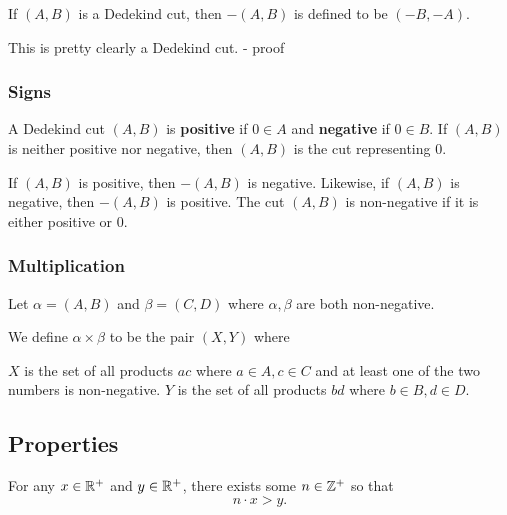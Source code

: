 If $(A,B)$ is a Dedekind cut, then $-(A,B)$ is defined to be
$(-B,-A)$.

This is pretty clearly a Dedekind cut. - proof

\subsubsection{Signs}
A Dedekind cut $(A,B)$ is \textbf{positive} if $0 \in A$ and \textbf{negative} if $0 \in B$. If $(A,B)$ is neither positive nor negative, then $(A,B)$ is the cut representing 0.

If $(A,B)$ is positive, then $-(A,B)$ is negative. Likewise, if $(A,B)$ is negative, then $-(A,B)$ is positive. The cut $(A,B)$ is non-negative if it is either positive or 0.

\subsubsection{Multiplication}

Let $\alpha = (A,B)$ and $\beta = (C,D)$ where $\alpha, \beta$ are both non-negative.

We define $\alpha \times \beta$ to be the pair $(X,Y)$ where

$X$ is the set of all products $ac$ where $a \in A, c \in C$ and at least one of the two numbers is non-negative. 
$Y$ is the set of all products $bd$ where $b \in B, d \in D$.




\subsection{Properties}
\begin{theorem}[$\RR$ is archimedian]\label{thrm:r-archimedian}
For any $x\in\mathbb R^+$ and $y\in\mathbb R^+$, there exists some $n\in\mathbb Z^+$ so that
\[n\cdot x>y.\]
\end{theorem}

